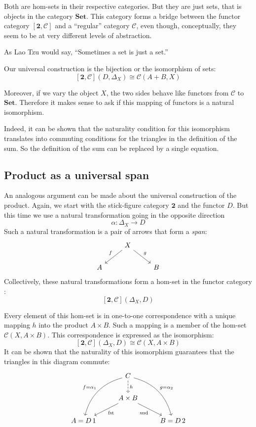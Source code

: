 \documentclass[DaoFP]{subfiles}
\begin{document}
Both are hom-sets in their respective categories. But they are just sets, that is objects in the category $\mathbf{Set}$. This category forms a bridge between the functor category $[\mathbf{2}, \mathcal{C}]$ and a ``regular'' category $\mathcal{C}$, even though, conceptually, they seem to be at very different levels of abstraction. 

As Lao Tzu would say, ``Sometimes a set is just a set.''

Our universal construction is the bijection or the isomorphism of sets:
\[ [\mathbf{2}, \mathcal{C}](D, \Delta_X)  \cong \mathcal{C}(A + B, X) \]

Moreover, if we vary the object $X$, the two sides behave like functors from  $\mathcal{C}$ to $\mathbf{Set}$. Therefore it makes sense to ask if this mapping of functors is a natural isomorphism. 

Indeed, it can be shown that the naturality condition for this isomorphism translates into commuting conditions for the triangles in the definition of the sum. So the definition of the sum can be replaced by a single equation.

\subsection{Product as a universal span}

An analogous argument can be made about the universal construction of the product. Again, we start with the stick-figure category $\mathbf{2}$ and the functor $D$. But this time we use a natural transformation going in the opposite direction
\[ \alpha \colon \Delta_X \to D \]
Such a natural transformation is a pair of arrows that form a \emph{span}:
\[
 \begin{tikzcd}
 &X
 \arrow[dl, "f"']
 \arrow[dr, "g"]
 \\
 A
 && B
  \end{tikzcd}
\]
Collectively, these natural transformations form a hom-set in the functor category :
\[[\mathbf{2}, \mathcal{C}](\Delta_X, D) \]

Every element of this hom-set is in one-to-one correspondence with a unique mapping $h$ into the product $A \times B$. Such a mapping is a member of the hom-set $\mathcal{C}(X, A \times B)$. This correspondence is expressed as the isomorphism:
\[ [\mathbf{2}, \mathcal{C}](\Delta_X, D)  \cong \mathcal{C}(X, A \times B) \]
It can be shown that the naturality of this isomorphism guarantees that the triangles in this diagram commute:
\[
 \begin{tikzcd}
 & C 
\arrow[d, dashed, "h"]
 \arrow[ddl, bend right, "f = \alpha_1"']
 \arrow[ddr, bend left, "g = \alpha_2"]
\\
&A \times B
 \arrow[dl,  "\text{fst}"]
  \arrow[dr,   "\text{snd}"']
\\
A = D\, 1 && B = D \, 2
 \end{tikzcd}
\]
\end{document}
